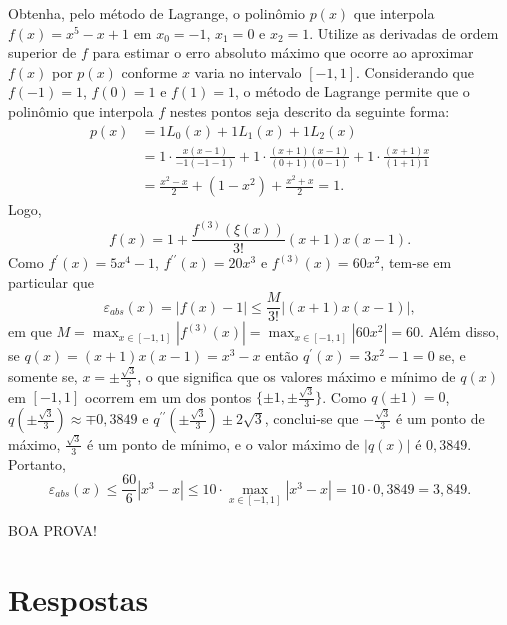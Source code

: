 \documentclass[12pt,a4paper]{article}
\begin{document}
\begin{ExerciseList}
\Exercise[title={2,0}]
Obtenha, pelo método de Lagrange, o polinômio $p(x)$ que interpola $f(x) = x^5 - x + 1$ em $x_0 = -1$, $x_1 = 0$ e $x_2 = 1$. Utilize as derivadas de ordem superior de $f$ para estimar o erro absoluto máximo que ocorre ao aproximar $f(x)$ por $p(x)$ conforme $x$ varia no intervalo $[-1, 1]$.
\Answer Considerando que $f(-1) = 1$, $f(0) = 1$ e $f(1) = 1$, o método de Lagrange permite que o polinômio que interpola $f$ nestes pontos seja descrito da seguinte forma:
\begin{align*}
p(x)
& = 1 L_0(x) + 1 L_1(x) + 1 L_2(x) \\
& = 1 \cdot \frac{x(x-1)}{-1(-1-1)}
  + 1 \cdot \frac{(x+1)(x-1)}{(0+1)(0-1)}
  + 1 \cdot \frac{(x+1)x}{(1+1)1}\\
& = \frac{x^2-x}{2}
    + (1-x^2)
    + \frac{x^2+x}{2} = 1.
\end{align*}
Logo,
\[
f(x) = 1 + \frac{f^{(3)}(\xi(x))}{3!}(x+1)x(x-1).
\]
Como $f^\prime(x) = 5x^4-1$, $f^{\prime\prime}(x) = 20x^3$ e $f^{(3)}(x) = 60x^2$, tem-se em particular que
\[
\varepsilon_{abs}(x)
= \left|f(x) - 1\right|
\leq \frac{M}{3!} \left|(x+1)x(x-1)\right|,
\]
em que $M
= \max_{x \in [-1,1]} \left|f^{(3)}(x)\right|
= \max_{x \in [-1,1]} \left|60x^2\right|
= 60$. Além disso, se $q(x) = (x+1)x(x-1) = x^3-x$ então $q^\prime(x) = 3x^2-1 = 0$ se, e somente se, $x = \pm\frac{\sqrt{3}}{3}$, o que significa que os valores máximo e mínimo de $q(x)$ em $[-1,1]$ ocorrem em um dos pontos $\{ \pm1, \pm\frac{\sqrt{3}}{3} \}$. Como $q(\pm1) = 0$, $q(\pm\frac{\sqrt{3}}{3}) \approx \mp0,3849$ e $q^{\prime\prime}(\pm\frac{\sqrt{3}}{3}) \pm 2\sqrt{3}$, conclui-se que $-\frac{\sqrt{3}}{3}$ é um ponto de máximo, $\frac{\sqrt{3}}{3}$ é um ponto de mínimo, e o valor máximo de $|q(x)|$ é $0,3849$. Portanto,
\[
\varepsilon_{abs}(x)
\leq \frac{60}{6} \left|x^3 - x\right|
\leq 10 \cdot \max_{x \in [-1,1]} \left|x^3 - x\right|
= 10 \cdot 0,3849
= 3,849.
\]
\end{ExerciseList}

\begin{center}
BOA PROVA!
\end{center}

\newpage
\restoregeometry
\section*{Respostas}
\shipoutAnswer
\end{document}
